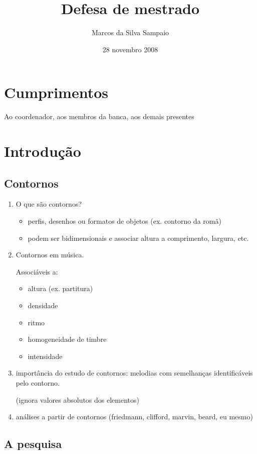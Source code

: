 \documentclass[12pt,a4paper]{article}
\title{Defesa de mestrado}
\author{Marcos da Silva Sampaio}
\date{28 novembro 2008}
\begin{document}
\maketitle

\section*{Cumprimentos}

Ao coordenador, aos membros da banca, aos demais presentes

\section{Introdução}

\subsection{Contornos}

\begin{enumerate}
\item O que são contornos?
  \begin{itemize}
  \item perfis, desenhos ou formatos de objetos (ex. contorno da romã)
  \item podem ser bidimensionais e associar altura a comprimento,
    largura, etc.
  \end{itemize}
\item Contornos em música.

  Associáveis a:
  \begin{itemize}
  \item altura (ex. partitura)
  \item densidade
  \item ritmo
  \item homogeneidade de timbre
  \item intensidade
  \end{itemize}
\item importância do estudo de contornos: melodias com semelhanças
  identificáveis pelo contorno.

  (ignora valores absolutos dos elementos)
\item análises a partir de contornos (friedmann, clifford, marvin, beard, eu mesmo)
\end{enumerate}

\subsection{A pesquisa}
\end{document}
